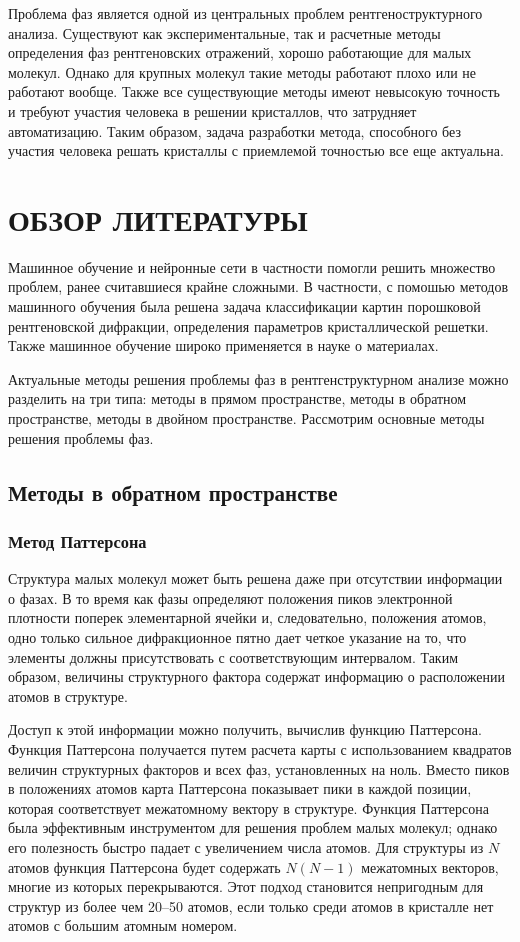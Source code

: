 \documentclass{article}
\begin{document}
Проблема фаз является одной из центральных проблем рентгеноструктурного анализа. Существуют как экспериментальные, так и расчетные методы определения фаз рентгеновских отражений, хорошо работающие для малых молекул. Однако для крупных молекул такие методы работают плохо или не работают вообще\cite{PhaseProblem}. Также все существующие методы имеют невысокую точность и требуют участия человека в решении кристаллов, что затрудняет автоматизацию. Таким образом, задача разработки метода, способного без участия человека решать кристаллы с приемлемой точностью все еще актуальна.

\section{ОБЗОР ЛИТЕРАТУРЫ}

Машинное обучение и нейронные сети в частности помогли решить множество проблем, ранее считавшиеся крайне сложными. В частности, с помошью методов машинного обучения была решена \cite{XRD-NN} задача классификации картин порошковой рентгеновской дифракции, определения параметров кристаллической решетки\cite{MCMC}. Также машинное обучение широко применяется в науке о материалах\cite{ML-mat}.

Актуальные методы решения проблемы фаз в рентгенструктурном анализе можно разделить на три типа: методы в прямом пространстве, методы в обратном пространстве, методы в двойном пространстве\cite{XR-ED}. Рассмотрим основные методы решения проблемы фаз.
\subsection{Методы в обратном пространстве}
\subsubsection{Метод Паттерсона}

Структура малых молекул может быть решена даже при отсутствии информации о фазах. В то время как фазы определяют положения пиков электронной плотности поперек элементарной ячейки и, следовательно, положения атомов, одно только сильное дифракционное пятно дает четкое указание на то, что элементы должны присутствовать с соответствующим интервалом. Таким образом, величины структурного фактора содержат информацию о расположении атомов в структуре.

Доступ к этой информации можно получить, вычислив функцию Паттерсона\cite{PattersonMethod}. Функция Паттерсона получается путем расчета карты с использованием квадратов величин структурных факторов и всех фаз, установленных на ноль. Вместо пиков в положениях атомов карта Паттерсона показывает пики в каждой позиции, которая соответствует межатомному вектору в структуре. Функция Паттерсона была эффективным инструментом для решения проблем малых молекул; однако его полезность быстро падает с увеличением числа атомов. Для структуры из $N$ атомов функция Паттерсона будет содержать $N (N - 1)$ межатомных векторов, многие из которых перекрываются. Этот подход становится непригодным для структур из более чем 20–50 атомов, если только среди атомов в кристалле нет атомов с большим атомным номером.
\end{document}
